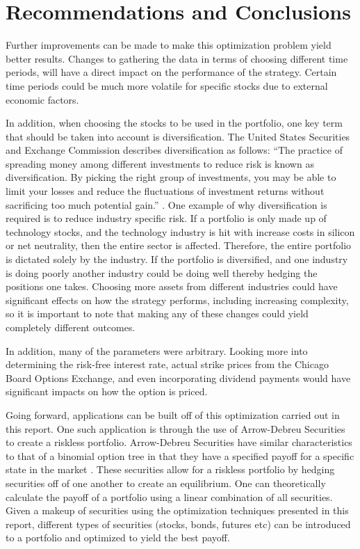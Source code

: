 \documentclass[12pt]{article}
\begin{document}
\section{Recommendations and Conclusions}
Further improvements can be made to make this optimization problem yield better results. Changes to gathering the data in terms of choosing different time periods, will have a direct impact on the performance of the strategy. Certain time periods could be much more volatile for specific stocks due to external economic factors. 

In addition, when choosing the stocks to be used in the portfolio, one key term that should be taken into account is diversification. The United States Securities and Exchange Commission describes diversification as follows: “The practice of spreading money among different investments to reduce risk is known as diversification. By picking the right group of investments, you may be able to limit your losses and reduce the fluctuations of investment returns without sacrificing too much potential gain.” \cite{diversity}.  One example of why diversification is required is to reduce industry specific risk. If a portfolio is only made up of technology stocks, and the technology industry is hit with increase costs in silicon or net neutrality, then the entire sector is affected. Therefore, the entire portfolio is dictated solely by the industry. If the portfolio is diversified, and one industry is doing poorly another industry could be doing well thereby hedging the positions one takes. Choosing more assets from different industries could have significant effects on how the strategy performs, including increasing complexity, so it is important to note that making any of these changes could yield completely different outcomes.

In addition, many of the parameters were arbitrary. Looking more into determining the risk-free interest rate, actual strike prices from the Chicago Board Options Exchange, and even incorporating dividend payments would have significant impacts on how the option is priced. 
	
Going forward, applications can be built off of this optimization carried out in this report. One such application is through the use of Arrow-Debreu Securities to create a riskless portfolio. Arrow-Debreu Securities have similar characteristics to that of a binomial option tree in that they have a specified payoff for a specific state in the market \cite{tirole2010theory, AD_secs}. These securities allow for a riskless portfolio by hedging securities off of one another to create an equilibrium. One can theoretically calculate the payoff of a portfolio using a linear combination of all securities. Given a makeup of securities using the optimization techniques presented in this report, different types of securities (stocks, bonds, futures etc) can be introduced to a portfolio and optimized to yield the best payoff.
	
\end{document}
